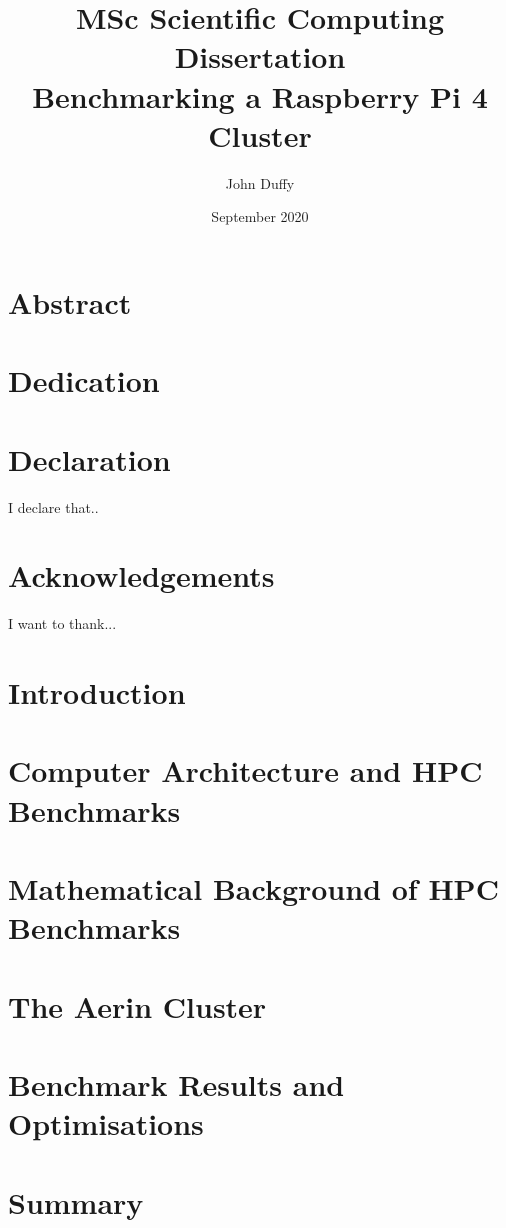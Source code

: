 \documentclass{report}
\title{MSc Scientific Computing Dissertation\\Benchmarking a Raspberry Pi 4 Cluster}
\author{John Duffy}
\date{September 2020}
\begin{document}
%
%
\maketitle
%


%
%
\chapter*{Abstract}
%


%
%
\chapter*{Dedication}


%
% 
\chapter*{Declaration}
I declare that..


%
%
\chapter*{Acknowledgements}
I want to thank...


%
%
\tableofcontents


%
%
\chapter{Introduction}



%
%
\chapter{Computer Architecture and HPC Benchmarks}



%
%
\chapter{Mathematical Background of HPC Benchmarks}



%
%
\chapter{The Aerin Cluster}



%
%
\chapter{Benchmark Results and Optimisations}



%
%
\chapter{Summary}

\end{document}

